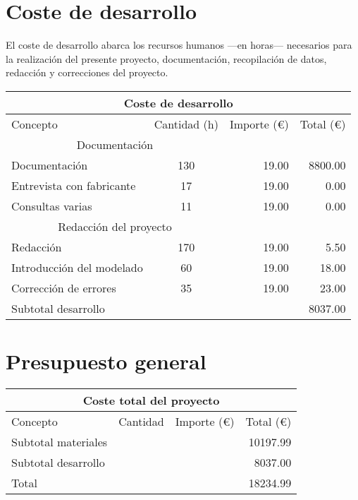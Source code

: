 \chapter*{Coste de desarrollo}
El coste de desarrollo abarca los recursos humanos —en horas— necesarios para la realización del presente proyecto, documentación, recopilación de datos, redacción y correcciones del proyecto.

\begin{table}[!htb]
\centering
\begin{tabular}{lcrr}
\toprule
\multicolumn{4}{c}{Coste de desarrollo}\\
\midrule
Concepto & Cantidad (h) & Importe (\euro) & Total (\euro)\\
\midrule
\multicolumn{2}{c}{Documentación}\\
\cmidrule(r){1-2}
Documentación & 130 & 19.00 & 8800.00\\
Entrevista con fabricante & 17 & 19.00 & 0.00\\
Consultas varias & 11 & 19.00 & 0.00\\
\multicolumn{2}{c}{Redacción del proyecto}\\
\cmidrule(r){1-2}
Redacción & 170 & 19.00 & 5.50\\
Introducción del modelado & 60 & 19.00 & 18.00\\
Corrección de errores & 35 & 19.00 & 23.00\\
\bottomrule
Subtotal desarrollo & & & 8037.00\\
\bottomrule
\end{tabular}
\label{presupuestodesarrollo}
\end{table}

\chapter*{Presupuesto general}

\begin{table}[!htb]
\centering
\begin{tabular}{lcrr}
\toprule
\multicolumn{4}{c}{Coste total del proyecto}\\
\midrule
Concepto & Cantidad & Importe (\euro) & Total (\euro)\\
\midrule
Subtotal materiales & & & 10197.99\\
Subtotal desarrollo & & & 8037.00\\
\bottomrule
Total & & & 18234.99\\
\bottomrule
\end{tabular}
\label{presupuestototal}
\end{table}


